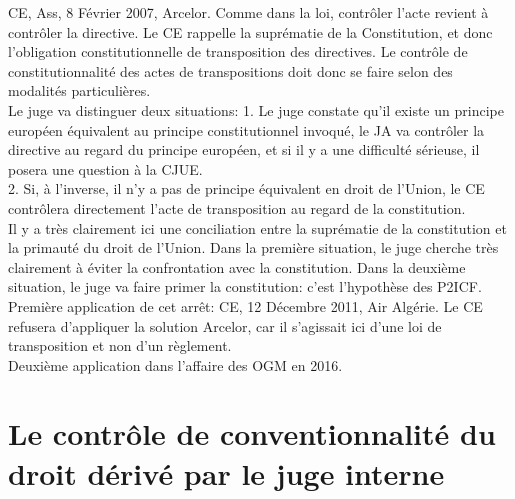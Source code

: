 \documentclass[10pt, a4paper, openany]{book}
\begin{document}
CE, Ass, 8 Février 2007, Arcelor. Comme dans la loi, contrôler l'acte revient à contrôler la directive. Le CE rappelle la suprématie de la Constitution, et donc l'obligation constitutionnelle de transposition des directives. Le contrôle de constitutionnalité des actes de transpositions doit donc se faire selon des modalités particulières. \\
Le juge va distinguer deux situations: 1. Le juge constate qu'il existe un principe européen équivalent au principe constitutionnel invoqué, le JA va contrôler la directive au regard du principe européen, et si il y a une difficulté sérieuse, il posera une question à la CJUE. \\
2. Si, à l'inverse, il n'y a pas de principe équivalent en droit de l'Union, le CE contrôlera directement l'acte de transposition au regard de la constitution. \\
Il y a très clairement ici une conciliation entre la suprématie de la constitution et la primauté du droit de l'Union. Dans la première situation, le juge cherche très clairement à éviter la confrontation avec la constitution. Dans la deuxième situation, le juge va faire primer la constitution: c'est l'hypothèse des P2ICF. \\
Première application de cet arrêt: CE, 12 Décembre 2011, Air Algérie. Le CE refusera d'appliquer la solution Arcelor, car il s'agissait ici d'une loi de transposition et non d'un règlement. \\
Deuxième application dans l'affaire des OGM en 2016. 

\section{Le contrôle de conventionnalité du droit dérivé par le juge interne}
\end{document}
